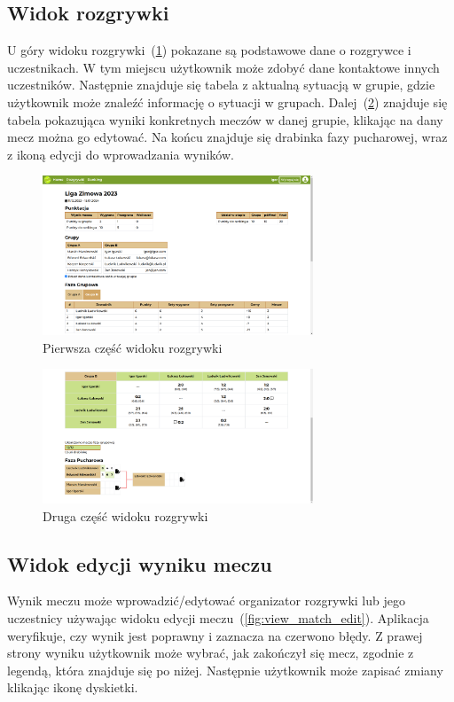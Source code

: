 \documentclass[shortabstract]{iithesis}
\begin{document}
\newpage
\subsection{Widok rozgrywki}
U góry widoku rozgrywki~(\ref{fig:view_torunament1}) pokazane są podstawowe dane o rozgrywce i uczestnikach.
W tym miejscu użytkownik może zdobyć dane kontaktowe innych uczestników.
Następnie znajduje się tabela z aktualną sytuacją w grupie, gdzie użytkownik może znaleźć informację o sytuacji w grupach.
Dalej~(\ref{fig:view_torunament2}) znajduje się tabela pokazująca wyniki konkretnych meczów w danej grupie, klikając na dany mecz można go edytować.
Na końcu znajduje się drabinka fazy pucharowej, wraz z ikoną edycji do wprowadzania wyników.
\begin{figure}[H]
    \centering
    \includegraphics[width=0.72\textwidth,valign=t]{assets/interfejs/rozgrywka_desktop.png}
    \caption{Pierwsza część widoku rozgrywki}
    \label{fig:view_torunament1}
\end{figure}
\begin{figure}[H]
    \centering
    \includegraphics[width=0.72\textwidth,valign=t]{assets/interfejs/rozgrywka_desktop2.png}
    \caption{Druga część widoku rozgrywki}
    \label{fig:view_torunament2}
\end{figure}

\subsection{Widok edycji wyniku meczu}
Wynik meczu może wprowadzić\slash edytować organizator rozgrywki lub jego uczestnicy używając widoku edycji meczu~(\ref{fig:view_match_edit}).
Aplikacja weryfikuje, czy wynik jest poprawny i zaznacza na czerwono błędy. Z prawej strony wyniku
użytkownik może wybrać, jak zakończył się mecz, zgodnie z legendą, która znajduje się po niżej.
Następnie użytkownik może zapisać zmiany klikając ikonę dyskietki.
\end{document}
